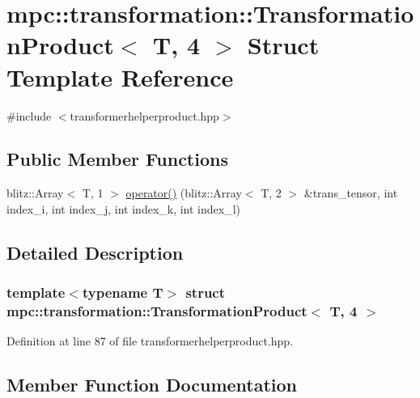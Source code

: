 \hypertarget{structmpc_1_1transformation_1_1_transformation_product_3_01_t_00_014_01_4}{}\section{mpc\+:\+:transformation\+:\+:Transformation\+Product$<$ T, 4 $>$ Struct Template Reference}
\label{structmpc_1_1transformation_1_1_transformation_product_3_01_t_00_014_01_4}


{\ttfamily \#include $<$transformerhelperproduct.\+hpp$>$}

\subsection*{Public Member Functions}
\begin{DoxyCompactItemize}
\item 
blitz\+::\+Array$<$ T, 1 $>$ \mbox{\hyperlink{structmpc_1_1transformation_1_1_transformation_product_3_01_t_00_014_01_4_a7469f9926dbbeb033654fea1e8e52e1f}{operator()}} (blitz\+::\+Array$<$ T, 2 $>$ \&trans\+\_\+tensor, int index\+\_\+i, int index\+\_\+j, int index\+\_\+k, int index\+\_\+l)
\end{DoxyCompactItemize}


\subsection{Detailed Description}
\subsubsection*{template$<$typename T$>$\newline
struct mpc\+::transformation\+::\+Transformation\+Product$<$ T, 4 $>$}



Definition at line 87 of file transformerhelperproduct.\+hpp.



\subsection{Member Function Documentation}
\mbox{\label{structmpc_1_1transformation_1_1_transformation_product_3_01_t_00_014_01_4_a7469f9926dbbeb033654fea1e8e52e1f}} 
